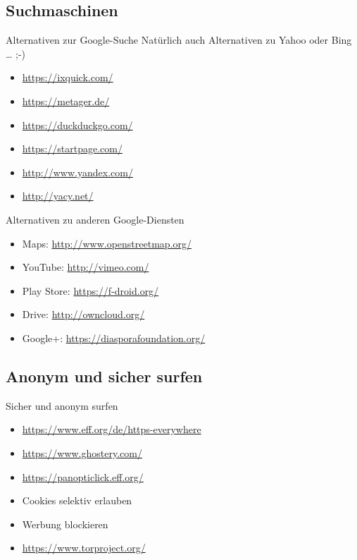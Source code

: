 \documentclass{beamer}
\begin{document}
\subsection{Suchmaschinen}

\begin{frame}{Alternativen zur Google-Suche}
    Natürlich auch Alternativen zu Yahoo oder Bing … ;-)

    \begin{itemize}
        \item \url{https://ixquick.com/}
        \item \url{https://metager.de/}
        \item \url{https://duckduckgo.com/}
        \item \url{https://startpage.com/}
        \item \url{http://www.yandex.com/}
        \item \url{http://yacy.net/}
    \end{itemize}
\end{frame}

\begin{frame}{Alternativen zu anderen Google-Diensten}
    \begin{itemize}
        \item Maps: \url{http://www.openstreetmap.org/}
        \item YouTube: \url{http://vimeo.com/}
        \item Play Store: \url{https://f-droid.org/}
        \item Drive: \url{http://owncloud.org/}
        \item Google+: \url{https://diasporafoundation.org/}
    \end{itemize}
\end{frame}

\subsection{Anonym und sicher surfen}

\begin{frame}{Sicher und anonym surfen}
    \begin{itemize}
        \item \url{https://www.eff.org/de/https-everywhere}
        \item \url{https://www.ghostery.com/}
        \item \url{https://panopticlick.eff.org/}
        \item Cookies selektiv erlauben
        \item Werbung blockieren
        \item \url{https://www.torproject.org/}
    \end{itemize}
\end{frame}
\end{document}
